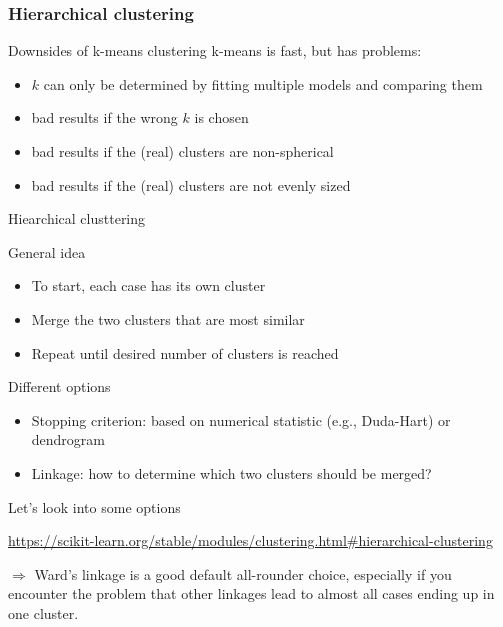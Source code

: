 \subsubsection{Hierarchical clustering}

\begin{frame}{Downsides of k-means clustering}
k-means is fast, but has problems:

\begin{itemize}
\item $k$ can only be determined by fitting multiple models and comparing them
\item bad results if the wrong $k$ is chosen
\item bad results if the (real) clusters are non-spherical
\item bad results if the (real) clusters are not evenly sized
\end{itemize}
\end{frame}


\begin{frame}{Hiearchical clusttering}
\begin{block}{General idea}
\begin{itemize}
\item To start, each case has its own cluster
\item Merge the two clusters that are most similar
\item Repeat until desired number of clusters is reached
\end{itemize}

\end{block}

\pause

\begin{block}{Different options}
\begin{itemize}
\item Stopping criterion: based on numerical statistic (e.g., Duda-Hart) or dendrogram
\item Linkage: how to determine which two clusters should be merged?
\end{itemize}

\end{block}
\end{frame}


\begin{frame}{Let's look into some options}

\url{https://scikit-learn.org/stable/modules/clustering.html\#hierarchical-clustering}

$\Rightarrow$ Ward's linkage is a good default all-rounder choice, especially if you encounter the problem that other linkages lead to almost all cases ending up in one cluster. 
\end{frame}


